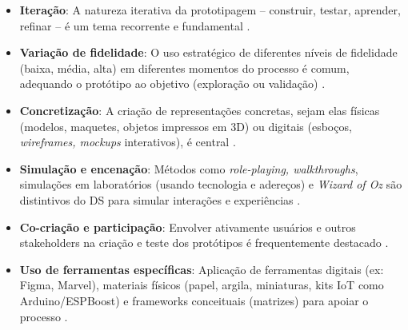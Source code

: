 \begin{itemize}
	\item \textbf{Iteração}: A natureza iterativa da prototipagem – construir, testar, aprender, refinar – é um tema recorrente e fundamental \cite{hegemann2024palette, quintero2021interdisciplinary, mager2023product, paust2025integrative, you2022applying, asbjornsen2022echange, kumar2023rheumatology, villa2022integratedcare, Suryawati2024, Kim2024}.
	
	\item \textbf{Variação de fidelidade}: O uso estratégico de diferentes níveis de fidelidade (baixa, média, alta) em diferentes momentos do processo é comum, adequando o protótipo ao objetivo (exploração ou validação) \cite{mager2023product, Vieira2025, asbjornsen2022echange, kumar2023rheumatology, wang2023smartproducts, villa2022integratedcare}.
	
	\item \textbf{Concretização}: A criação de representações concretas, sejam elas físicas (modelos, maquetes, objetos impressos em 3D) ou digitais (esboços, \textit{wireframes, mockups} interativos), é central \cite{paust2025integrative, quintero2021interdisciplinary, nguyen2022human, lee2023industry, asbjornsen2022echange, villa2022integratedcare}.
	
	\item \textbf{Simulação e encenação}: Métodos como \textit{role-playing, walkthroughs}, simulações em laboratórios (usando tecnologia e adereços) e \textit{Wizard of Oz} são distintivos do DS para simular interações e experiências \cite{soto2023prototyping, lee2022how, mager2023product, seko2024transitions, yan2022pssvalue, Kim2024}.
	
	\item \textbf{Co-criação e participação}: Envolver ativamente usuários e outros stakeholders na criação e teste dos protótipos é frequentemente destacado \cite{asbjornsen2022echange, dehmel2021weather, kumar2023rheumatology, lambe2022capabilities, milton2021eatingdisorders, seko2024transitions, soto2023prototyping}.
	
	\item \textbf{Uso de ferramentas específicas}: Aplicação de ferramentas digitais (ex: Figma, Marvel), materiais físicos (papel, argila, miniaturas, kits IoT como Arduino/ESPBoost) e frameworks conceituais (matrizes) para apoiar o processo \cite{villa2022integratedcare, asbjornsen2022echange, quintero2021interdisciplinary, soto2023prototyping, Kim2024, lee2023industry, yan2022pssvalue}.
\end{itemize}


